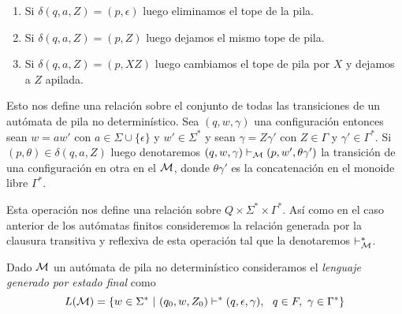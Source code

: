\documentclass[tesis.tex]{subfiles}
\begin{document}
\begin{enumerate}
	\item Si $\delta(q,a,Z) = (p,\epsilon)$ luego eliminamos el tope de la pila.
	\item Si $\delta(q,a,Z) =  (p,Z)$ luego dejamos el mismo tope de pila.
	\item Si $\delta(q,a,Z) = (p, XZ)$ luego cambiamos el tope de pila por $X$ y dejamos a $Z$ apilada.
\end{enumerate}


Esto nos define una relación sobre el conjunto de todas las transiciones de un autómata de pila no determinístico.
Sea $(q,w,\gamma)$ una configuración entonces sean $w = aw'$ con $a \in \Sigma \cup \{ \epsilon \}$ y $w' \in \Sigma^*$  y sean $\gamma = Z\gamma'$ con $Z \in \Gamma$ y $\gamma' \in \Gamma^{*}$.
Si $(p,\theta) \in \delta (q,a,Z)$  luego denotaremos $(q,w,\gamma) \vdash_{\cal M} (p,w',\theta\gamma')$ la transición de una configuración en otra en el \APND $\cal M$,
donde $\theta \gamma'$ es la concatenación en el monoide libre $\Gamma^{*}$. 

Esta operación nos define una relación sobre $Q \times \Sigma^* \times \Gamma^*$.
Así como en el caso anterior de los autómatas finitos consideremos la relación generada por la clausura transitiva y reflexiva de esta operación tal que la denotaremos $\vdash^*_{\cal M}$.


\begin{deff}
	Dado $\cal M$ un autómata de pila no determinístico consideramos el \emph{lenguaje generado por estado final} como
	\begin{equation*}
		L( {\cal M}) = \{ w \in \Sigma^* \ | \ (q_0,w,Z_0) \vdash^* (q, \epsilon, \gamma), \ \ q \in F, \ \gamma \in \Gamma^*      \}
	\end{equation*}
\end{deff}
\end{document}
